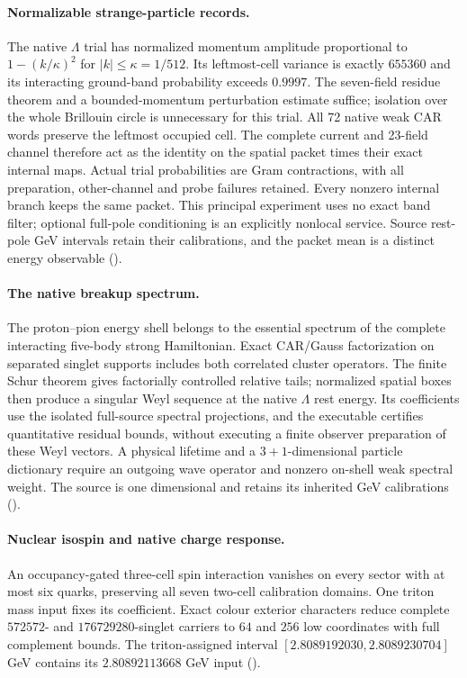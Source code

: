 \paragraph{Normalizable strange-particle records.}
The native $\Lambda$ trial has normalized momentum amplitude proportional
to $1-(k/\kappa)^2$ for $|k|\le\kappa=1/512$. Its leftmost-cell variance
is exactly $655360$ and its interacting ground-band probability exceeds
$0.9997$. The seven-field residue theorem and a bounded-momentum
perturbation estimate suffice; isolation over the whole Brillouin circle
is unnecessary for this trial. All 72 native weak CAR words preserve
the leftmost occupied cell. The complete current and 23-field channel
therefore act as the identity on the spatial packet times their exact
internal maps. Actual trial probabilities are Gram contractions, with
all preparation, other-channel and probe failures retained. Every
nonzero internal branch keeps the same packet. This principal experiment
uses no exact band filter; optional full-pole conditioning is an
explicitly nonlocal service. Source rest-pole GeV intervals retain their
calibrations, and the packet mean is a distinct energy observable
().

\paragraph{The native breakup spectrum.}
The proton--pion energy shell belongs to the essential spectrum of the
complete interacting five-body strong Hamiltonian. Exact CAR/Gauss
factorization on separated singlet supports includes both correlated
cluster operators. The finite Schur theorem gives factorially controlled
relative tails; normalized spatial boxes then produce a singular Weyl
sequence at the native $\Lambda$ rest energy. Its coefficients use the
isolated full-source spectral projections, and the executable certifies
quantitative residual bounds, without executing a finite observer
preparation of these Weyl vectors. A physical lifetime and a
$3+1$-dimensional particle dictionary require an outgoing wave operator
and nonzero on-shell weak spectral weight. The source
is one dimensional and retains its inherited GeV calibrations
().

\paragraph{Nuclear isospin and native charge response.}
An occupancy-gated three-cell spin interaction vanishes on every sector
with at most six quarks, preserving all seven two-cell calibration domains.
One triton mass input fixes its coefficient. Exact colour exterior
characters reduce complete $572572$- and $176729280$-singlet carriers to
$64$ and $256$ low coordinates with full complement bounds. The
triton-assigned interval $[2.8089192030,2.8089230704]$ GeV contains its
$2.80892113668$ GeV input ().

